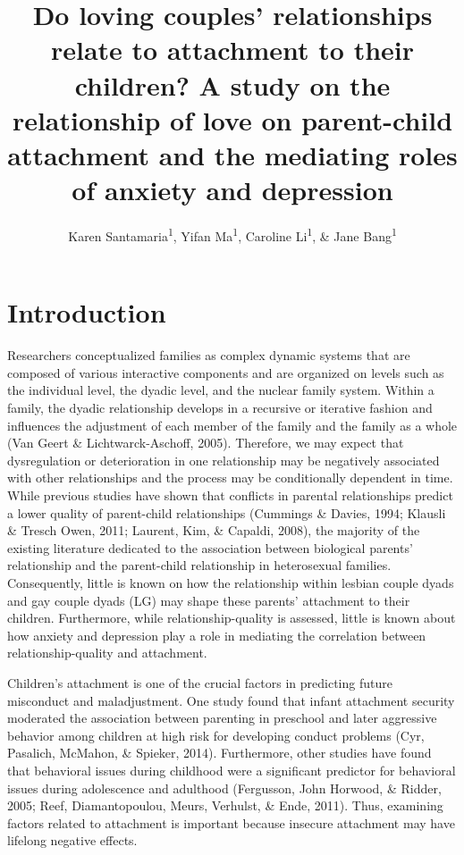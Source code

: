 \documentclass[man]{apa6}
\title{Do loving couples' relationships relate to attachment to their children? A study on the relationship of love on parent-child attachment and the mediating roles of anxiety and depression}
\author{Karen Santamaria\textsuperscript{1}, Yifan Ma\textsuperscript{1}, Caroline Li\textsuperscript{1}, \& Jane Bang\textsuperscript{1}}
\date{}
\affiliation{
\vspace{0.5cm}
\textsuperscript{1} Smith College}
\begin{document}
\maketitle

\hypertarget{introduction}{%
\section{Introduction}\label{introduction}}

Researchers conceptualized families as complex dynamic systems that are composed of various interactive components and are organized on levels such as the individual level, the dyadic level, and the nuclear family system. Within a family, the dyadic relationship develops in a recursive or iterative fashion and influences the adjustment of each member of the family and the family as a whole (Van Geert \& Lichtwarck-Aschoff, 2005). Therefore, we may expect that dysregulation or deterioration in one relationship may be negatively associated with other relationships and the process may be conditionally dependent in time. While previous studies have shown that conflicts in parental relationships predict a lower quality of parent-child relationships (Cummings \& Davies, 1994; Klausli \& Tresch Owen, 2011; Laurent, Kim, \& Capaldi, 2008), the majority of the existing literature dedicated to the association between biological parents' relationship and the parent-child relationship in heterosexual families. Consequently, little is known on how the relationship within lesbian couple dyads and gay couple dyads (LG) may shape these parents' attachment to their children. Furthermore, while relationship-quality is assessed, little is known about how anxiety and depression play a role in mediating the correlation between relationship-quality and attachment.

Children's attachment is one of the crucial factors in predicting future misconduct and maladjustment. One study found that infant attachment security moderated the association between parenting in preschool and later aggressive behavior among children at high risk for developing conduct problems (Cyr, Pasalich, McMahon, \& Spieker, 2014). Furthermore, other studies have found that behavioral issues during childhood were a significant predictor for behavioral issues during adolescence and adulthood (Fergusson, John Horwood, \& Ridder, 2005; Reef, Diamantopoulou, Meurs, Verhulst, \& Ende, 2011). Thus, examining factors related to attachment is important because insecure attachment may have lifelong negative effects.
\end{document}
